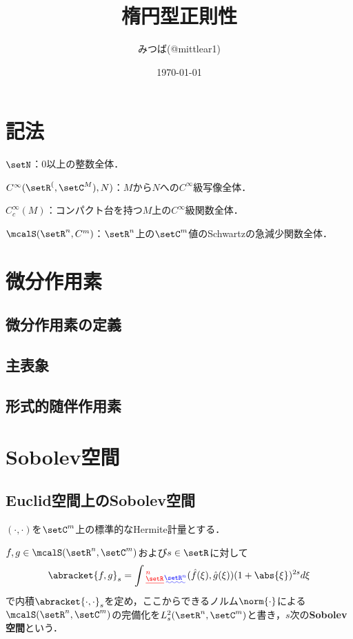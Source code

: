 \documentclass[uplatex,dvipdfmx]{jsarticle}
\title{楕円型正則性}
\author{みつば(@mittlear1)}
\date{\today}
\newcommand{\smooth}{$C^{\infty}$級}
\newcommand{\sobolev}[1]{L^{2}_{#1}}
\newcommand{\sobolevlocal}[3]{\sobolev{#1}(\setR^{#2},\setC^{#3})}
\newcommand{\smoothfct}[2]{C^{\infty}(\setR^{#1},\setC^{#2})} %
\newcommand{\schwartz}[2]{\mcalS(\setR^{#1},\setC^{#2})}
\newcommand{\dd}{d} %
\providecommand{\DIFadd}[1]{{\protect\color{blue}\uwave{#1}}} %
\providecommand{\DIFdel}[1]{{\protect\color{red}\sout{#1}}}                      %
\providecommand{\DIFaddbegin}{} %
\providecommand{\DIFaddend}{} %
\providecommand{\DIFdelbegin}{} %
\providecommand{\DIFdelend}{} %
\begin{document}
\maketitle
\tableofcontents

\newpage
\section*{記法}
$\setN$：0以上の整数全体．

\DIFdelbegin \DIFdel{$\smoothfct(M,N)$}\DIFdelend \DIFaddbegin \DIFadd{$C^\infty(M,N)$}\DIFaddend ：$M$から$N$への\smooth 写像全体．

$C^{\infty}_c(M)$：コンパクト台を持つ$M$上の\smooth 関数全体．

$\mcalS(\setR^n,C^m)$：$\setR^n$上の$\setC^m$値のSchwartzの急減少関数全体．



\newpage
\section{微分作用素}

\subsection{微分作用素の定義}

\subsection{主表象}

\subsection{形式的随伴作用素}

\newpage
\section{Sobolev空間}

\subsection{Euclid空間上のSobolev空間}

$(\cdot,\cdot)$を$\setC^m$上の標準的なHermite計量とする．

\begin{definition}
  $f, g\in \schwartz{n}{m}$および$s\in \setR$に対して
  \[ \abracket{f,g}_s=\int\DIFdelbegin \DIFdel{_\setR^n }\DIFdelend \DIFaddbegin \DIFadd{_{\setR^n} }\DIFaddend (\hat{f}(\xi),\hat{g}(\xi))(1+\abs{\xi})^{2s}\dd \xi \]
\DIFdelbegin %
\DIFdelend で内積$\abracket{\cdot,\cdot}_s$を定め，ここからできるノルム\DIFdelbegin \DIFdel{$\norm{\cdot}$}\DIFdelend \DIFaddbegin \DIFadd{$\norm{\cdot}_s$}\DIFaddend による
$\schwartz{n}{m}$の完備化を$\sobolevlocal{s}{n}{m}$と書き，$s$次の\textbf{Sobolev空間}という．
\DIFaddbegin \end{definition}
\DIFaddend 
\end{document}
